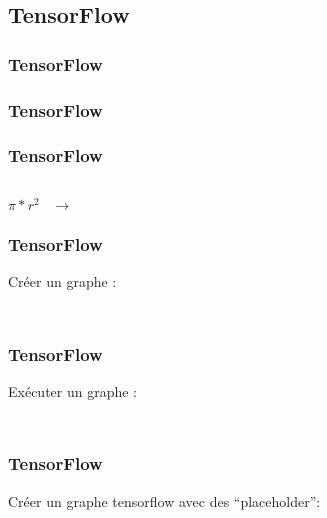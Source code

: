 \subsection{TensorFlow}


\begin{frame}
  \frametitle{TensorFlow}
\end{frame}

\begin{frame}
  \frametitle{TensorFlow}
\end{frame}

\begin{frame}
  \frametitle{TensorFlow}
  \begin{minipage}[l]{0.15\linewidth}
      $\;$
  \end{minipage}\hfill
  \begin{minipage}[l]{0.35\linewidth}
    \huge
    \begin{center}
      $\pi*r^2\;\;\;\rightarrow$
    \end{center}
  \end{minipage}\hfill
  \begin{minipage}[l]{0.49\linewidth}
  \end{minipage}\hfill
\end{frame}

\begin{frame}
  \frametitle{TensorFlow}
  Créer un graphe :
  \inputminted[linenos,fontsize=\small,bgcolor=pythonbg]{python}{code-illustration/tf-create_graph.py}
  \inputminted[linenos,fontsize=\small,bgcolor=returnbg]{text}{code-illustration/tf-create_graph.txt}
\end{frame}

\begin{frame}
  \frametitle{TensorFlow}
  Exécuter un graphe :
  \inputminted[linenos,fontsize=\small,bgcolor=pythonbg]{python}{code-illustration/tf-run_graph.py}
  \inputminted[linenos,fontsize=\small,bgcolor=returnbg]{text}{code-illustration/tf-run_graph.txt}
\end{frame}

\begin{frame}
  \frametitle{TensorFlow}
  Créer un graphe tensorflow avec des ``placeholder'':
  \inputminted[linenos,fontsize=\small,bgcolor=pythonbg]{python}{code-illustration/tf-create_graph_placeholder.py}
  \inputminted[linenos,fontsize=\small,bgcolor=returnbg]{text}{code-illustration/tf-create_graph_placeholder.txt}
\end{frame}


